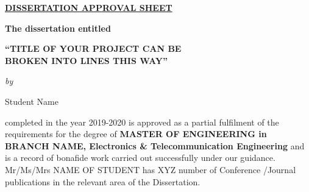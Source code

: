 \begin{center}
%
\underline{\bfseries \huge DISSERTATION APPROVAL SHEET}\\
\vspace{0.4cm}
\begin{figure}[H]
{\centering {}\par}
\end{figure}
\vspace{-0.6cm}
{\bfseries The dissertation entitled}\\
\vspace{0.2cm}
\begin{large}
{\bfseries ``TITLE OF YOUR PROJECT CAN BE\\BROKEN INTO LINES THIS WAY''}\\
\end{large}
\vspace{0.1cm}
\begin{small}
\emph{by}\\
\end{small}
\vspace{-0.5cm}
\begin{center}
Student  Name \\
\vspace{-0.5cm}
\end{center}
\end{center}
\noindent completed in the year 2019-2020 is approved as a partial fulfilment of the requirements for the degree of {\bfseries MASTER OF ENGINEERING in BRANCH NAME, Electronics \& Telecommunication Engineering} and is a record of bonafide work carried out successfully under our guidance.\\
\noindent Mr/Ms/Mrs NAME OF STUDENT has XYZ number of Conference /Journal publications in the relevant area of the Dissertation.


